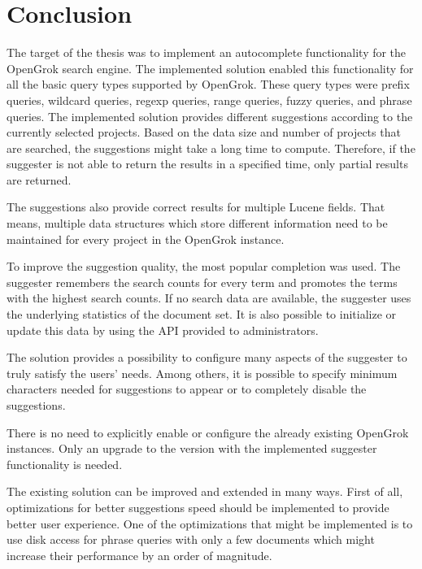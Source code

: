 \chapter*{Conclusion}
\label{chap:epilog}


The target of the thesis was to implement an autocomplete functionality for the OpenGrok search engine. The implemented
solution enabled this functionality for all the basic query types supported by OpenGrok. These query types were prefix queries,
wildcard queries, regexp queries, range queries, fuzzy queries, and phrase queries. The implemented solution
provides different suggestions according to the currently selected projects.
Based on the data size and number of projects
that are searched, the suggestions might take a long time to compute. Therefore, if the suggester is not able to return
the results in a specified time, only partial results are returned.

The suggestions also provide correct results for multiple Lucene fields. That means, multiple data structures
which store different information need to be maintained for every project in the OpenGrok instance.

To improve the suggestion quality, the most popular completion was used. The suggester remembers the search counts
for every term and promotes the terms with the highest search counts. If no search data are available, the suggester
uses the underlying statistics of the document set. It is also possible to initialize or update this data by using the API
provided to administrators.

The solution provides a possibility to configure many aspects of the suggester to truly satisfy the users' needs.
Among others, it is possible to specify minimum characters needed for suggestions to appear or to completely disable
the suggestions.

There is no need to explicitly enable or configure the already existing OpenGrok instances. Only an upgrade to the
version with the implemented suggester functionality is needed.

The existing solution can be improved and extended in many ways. First of all, optimizations for better suggestions
speed should be implemented to provide better user experience. One of the optimizations that might be implemented is to use
disk access for phrase queries with only a few documents which might increase their performance by an order of magnitude.


